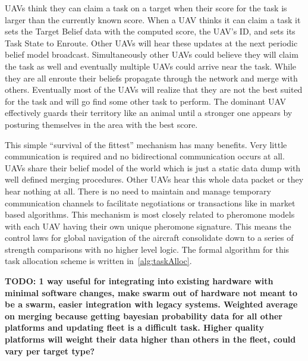 UAVs think they can claim a task on a target when their score for the task is larger than the currently known score.  When a UAV thinks it can claim a task it sets the Target Belief data with the computed score, the UAV's ID, and sets its Task State to Enroute.  Other UAVs will hear these updates at the next periodic belief model broadcast.  Simultaneously other UAVs could believe they will claim the task as well and eventually multiple UAVs could arrive near the task.  While they are all enroute their beliefs propagate through the network and merge with others.  Eventually most of the UAVs will realize that they are not the best suited for the task and will go find some other task to perform.  The dominant UAV effectively guards their territory like an animal until a stronger one appears by posturing themselves in the area with the best score.

This simple ``survival of the fittest'' mechanism has many benefits.  Very little communication is required and no bidirectional communication occurs at all.  UAVs share their belief model of the world which is just a static data dump with well defined merging procedures.  Other UAVs hear this whole data packet or they hear nothing at all.  There is no need to maintain and manage temporary communication channels to facilitate negotiations or transactions like in market based algorithms.  This mechanism is most closely related to pheromone models with each UAV having their own unique pheromone signature.  This means the control laws for global navigation of the aircraft consolidate down to a series of strength comparisons with no higher level logic.  The formal algorithm for this task allocation scheme is written in~\ref{alg:taskAlloc}.

\textbf{TODO: 1 way useful for integrating into existing hardware with minimal software changes, make swarm out of hardware not meant to be a swarm, easier integration with legacy systems. Weighted average on merging because getting bayesian probability data for all other platforms and updating fleet is a difficult task. Higher quality platforms will weight their data higher than others in the fleet, could vary per target type?}
